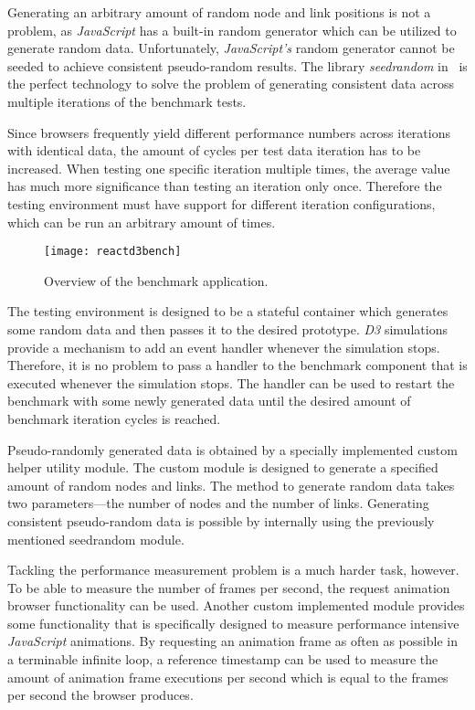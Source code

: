 Generating an arbitrary amount of random node and link positions is not a problem, as \emph{JavaScript} has a built-in random generator which can be utilized to generate random data. Unfortunately, \emph{JavaScript's} random generator cannot be seeded to achieve consistent pseudo-random results. The library \emph{seedrandom} in~\cite{SeedRandom} is the perfect technology to solve the problem of generating consistent data across multiple iterations of the benchmark tests.

Since browsers frequently yield different performance numbers across iterations with identical data, the amount of cycles per test data iteration has to be increased. When testing one specific iteration multiple times, the average value has much more significance than testing an iteration only once. Therefore the testing environment must have support for different iteration configurations, which can be run an arbitrary amount of times.

\begin{figure}
  \centering
  \texttt{[image: reactd3bench]}
  \caption{Overview of the benchmark application.}
  \label{fig:reactD3bench1}
\end{figure}

The testing environment is designed to be a stateful container which generates some random data and then passes it to the desired prototype. \emph{D3} simulations provide a mechanism to add an event handler whenever the simulation stops. Therefore, it is no problem to pass a handler to the benchmark component that is executed whenever the simulation stops. The handler can be used to restart the benchmark with some newly generated data until the desired amount of benchmark iteration cycles is reached.

Pseudo-randomly generated data is obtained by a specially implemented custom helper utility module. The custom module is designed to generate a specified amount of random nodes and links. The method to generate random data takes two parameters---the number of nodes and the number of links. Generating consistent pseudo-random data is possible by internally using the previously mentioned seedrandom module.

Tackling the performance measurement problem is a much harder task, however. To be able to measure the number of frames per second, the request animation browser functionality can be used. Another custom implemented module provides some functionality that is specifically designed to measure performance intensive \emph{JavaScript} animations. By requesting an animation frame as often as possible in a terminable infinite loop, a reference timestamp can be used to measure the amount of animation frame executions per second which is equal to the frames per second the browser produces.

